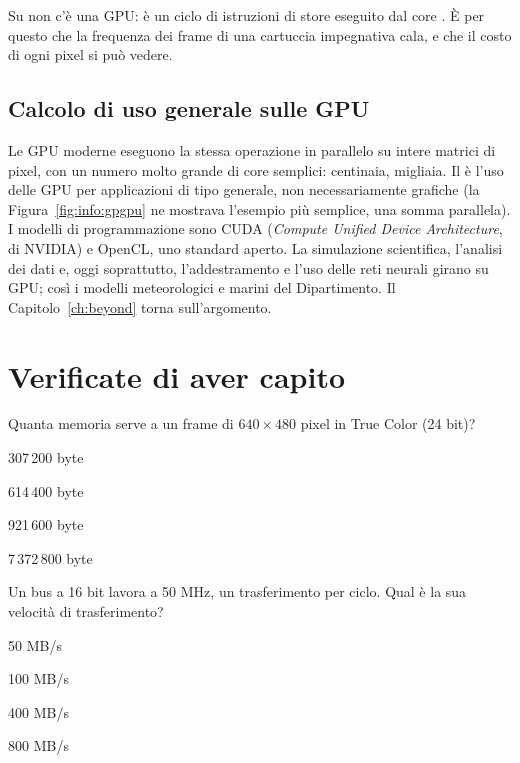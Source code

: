 \begin{prgmachine}
Su \prg non c'è una GPU:  è un ciclo di istruzioni di
store eseguito dal core \riscv. È per questo che la frequenza dei frame di una
cartuccia impegnativa cala, e che il costo di ogni pixel si può vedere.
\end{prgmachine}

\subsection{Calcolo di uso generale sulle GPU}

Le GPU moderne eseguono la stessa operazione in parallelo su intere matrici di
pixel, con un numero molto grande di core semplici: centinaia, migliaia. Il
 è l'uso delle GPU per applicazioni di tipo generale, non
necessariamente grafiche (la Figura~\ref{fig:info:gpgpu} ne mostrava l'esempio
più semplice, una somma parallela). I modelli di programmazione sono CUDA
(\emph{Compute Unified Device Architecture}, di NVIDIA) e OpenCL, uno standard
aperto. La simulazione scientifica, l'analisi dei dati e, oggi soprattutto,
l'addestramento e l'uso delle reti neurali girano su GPU; così i modelli
meteorologici e marini del Dipartimento. Il Capitolo~\ref{ch:beyond} torna
sull'argomento.





\section{Verificate di aver capito}

\begin{quiz}{Quanta memoria serve a un frame di $640\times 480$ pixel in True Color (24 bit)?}
\item 307\,200 byte
\item 614\,400 byte
\item 921\,600 byte
\item 7\,372\,800 byte
\end{quiz}

\begin{quiz}{Un bus a 16 bit lavora a 50 MHz, un trasferimento per ciclo. Qual è la sua velocità di trasferimento?}
\item 50 MB/s
\item 100 MB/s
\item 400 MB/s
\item 800 MB/s
\end{quiz}

